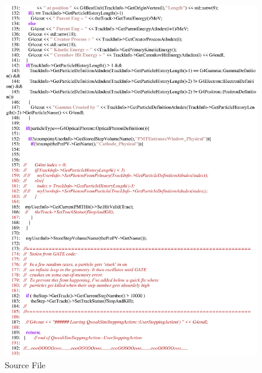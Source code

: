 \begin{figure}[h]
  \hspace{0cm}
  \includegraphics[scale=0.8]{./figures16/QweakSimSteppingAction.cc-p3.eps}
  \caption{Source File}
           \label{fig:XVI-SC-4}
\end{figure}
\clearpage

